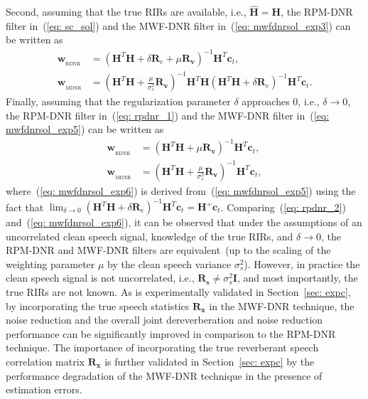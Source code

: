 \documentclass[10pt]{IEEEtran}
\begin{document}
Second, assuming that the true RIRs are available, i.e., $\mathbf{\hat{H}} = \mathbf{H}$, the RPM-DNR filter in~(\ref{eq: sc_sol}) and the MWF-DNR filter in~(\ref{eq: mwfdnrsol_exp3}) can be written as
\begin{align}
\label{eq: rpdnr_1}
\mathbf{w}_{_{\text{RDNR}}} &= (\mathbf{H}^T\mathbf{H} + \delta \mathbf{R}_{e}+ \mu \mathbf{R}_{\mathbf{v}})^{-1}\mathbf{H}^T\mathbf{c}_{t}, \\
\label{eq: mwfdnrsol_exp5}
\mathbf{w}_{_{\text{MDNR}}} &= (\mathbf{H}^T \mathbf{H} + \frac{\mu}{\sigma_s^2} \mathbf{R}_{\mathbf{v}})^{-1}\mathbf{H}^T \mathbf{H}(\mathbf{H}^T\mathbf{H}+\delta\mathbf{R}_{e})^{-1} \mathbf{H}^T\mathbf{c}_{t}.
\end{align}
Finally, assuming that the regularization parameter $\delta$ approaches $0$, i.e., $\delta \rightarrow 0$, the RPM-DNR filter in~(\ref{eq: rpdnr_1}) and the MWF-DNR filter in~(\ref{eq: mwfdnrsol_exp5}) can be written as
\begin{align}
\label{eq: rpdnr_2}
\mathbf{w}_{_{\text{RDNR}}} &= (\mathbf{H}^T\mathbf{H} + \mu \mathbf{R}_{\mathbf{v}})^{-1}\mathbf{H}^T\mathbf{c}_{t}, \\
\label{eq: mwfdnrsol_exp6}
\mathbf{w}_{_{\text{MDNR}}} &= (\mathbf{H}^T \mathbf{H} + \frac{\mu}{\sigma_s^2} \mathbf{R}_{\mathbf{v}})^{-1}\mathbf{H}^T\mathbf{c}_{t},
\end{align}
where~(\ref{eq: mwfdnrsol_exp6}) is derived from~(\ref{eq: mwfdnrsol_exp5}) using the fact that $\lim_{\delta \rightarrow 0} (\mathbf{H}^T\mathbf{H}+\delta\mathbf{R}_{e})^{-1} \mathbf{H}^T\mathbf{c}_{t} = \mathbf{H}^+\mathbf{c}_{t}$.
Comparing~(\ref{eq: rpdnr_2}) and~(\ref{eq: mwfdnrsol_exp6}), it can be observed that under the assumptions of an uncorrelated clean speech signal, knowledge of the true RIRs, and $\delta \rightarrow 0$, the RPM-DNR and MWF-DNR filters are equivalent~(up to the scaling of the weighting parameter $\mu$ by the clean speech variance $\sigma_s^2$).
However, in practice the clean speech signal is not uncorrelated, i.e., $\mathbf{R}_{\mathbf{s}} \neq \sigma_s^2 \mathbf{I}$, and most importantly, the true RIRs are not known.
As is experimentally validated in Section~\ref{sec: expc}, by incorporating the true speech statistics $\mathbf{R}_{\mathbf{x}}$ in the MWF-DNR technique, the noise reduction and the overall joint dereverberation and noise reduction performance can be significantly improved in comparison to the RPM-DNR technique.
The importance of incorporating the true reverberant speech correlation matrix $\mathbf{R}_{\mathbf{x}}$ is further validated in Section~\ref{sec: expc} by the performance degradation of the MWF-DNR technique in the presence of estimation errors.
\end{document}
